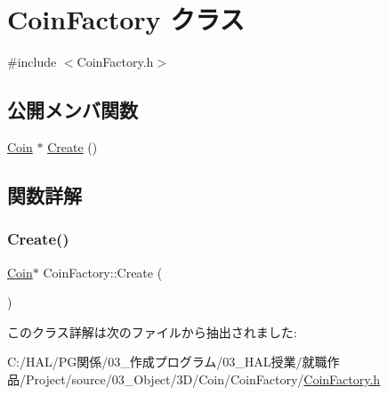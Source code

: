 \hypertarget{class_coin_factory}{}\section{Coin\+Factory クラス}
\label{class_coin_factory}


{\ttfamily \#include $<$Coin\+Factory.\+h$>$}

\subsection*{公開メンバ関数}
\begin{DoxyCompactItemize}
\item 
\mbox{\hyperlink{class_coin}{Coin}} $\ast$ \mbox{\hyperlink{class_coin_factory_a0d2390aa7215c9802edabfe11ab62006}{Create}} ()
\end{DoxyCompactItemize}


\subsection{関数詳解}
\mbox{\label{class_coin_factory_a0d2390aa7215c9802edabfe11ab62006}} 
\subsubsection{\texorpdfstring{Create()}{Create()}}
{\footnotesize\ttfamily \mbox{\hyperlink{class_coin}{Coin}}$\ast$ Coin\+Factory\+::\+Create (\begin{DoxyParamCaption}{ }\end{DoxyParamCaption})\hspace{0.3cm}{\ttfamily [inline]}}



このクラス詳解は次のファイルから抽出されました\+:\begin{DoxyCompactItemize}
\item 
C\+:/\+H\+A\+L/\+P\+G関係/03\+\_\+作成プログラム/03\+\_\+\+H\+A\+L授業/就職作品/\+Project/source/03\+\_\+\+Object/3\+D/\+Coin/\+Coin\+Factory/\mbox{\hyperlink{_coin_factory_8h}{Coin\+Factory.\+h}}\end{DoxyCompactItemize}
